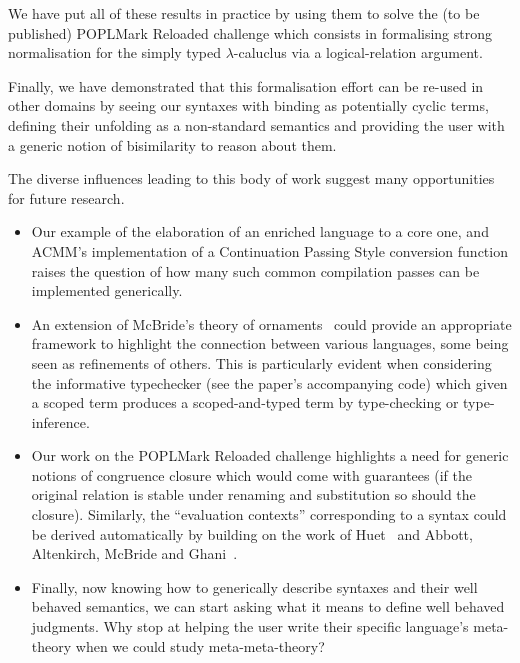 We have put all of these results in practice by using them to solve the (to be
published) POPLMark Reloaded challenge which consists in formalising strong
normalisation for the simply typed $\lambda$-caluclus via a logical-relation
argument.

Finally, we have demonstrated that this formalisation effort can be re-used
in other domains by seeing our syntaxes with binding as potentially cyclic
terms, defining their unfolding as a non-standard semantics and providing the
user with a generic notion of bisimilarity to reason about them.

The diverse influences leading to this body of work suggest many opportunities
for future research.
\begin{itemize}
\item Our example of the elaboration of an enriched language to a core one, and ACMM's
implementation of a Continuation Passing Style conversion function raises the question
of how many such common compilation passes can be implemented generically.

\item An extension of McBride's theory of ornaments~\citeyear{mcbride2010ornamental}
could provide an appropriate framework to highlight the connection between various
languages, some being seen as refinements of others. This is particularly
evident when considering the informative typechecker (see the paper's accompanying
code) which given a scoped term produces a scoped-and-typed term by
type-checking or type-inference.

\item Our work on the POPLMark Reloaded challenge highlights a need for generic
notions of congruence closure which would come with guarantees (if the original
relation is stable under renaming and substitution so should the closure).
Similarly, the ``evaluation contexts'' corresponding to a syntax could be
derived automatically by building on the work of Huet~\citeyear{huet_1997}
and Abbott, Altenkirch, McBride and Ghani~\citeyear{abbott2005data}.

\item Finally, now knowing how to generically describe syntaxes and their
well behaved semantics, we can start asking what it means to define
well behaved judgments. Why stop at helping the user write their specific
language's meta-theory when we could study meta-meta-theory?
\end{itemize}

\newpage

